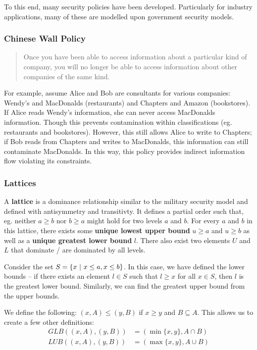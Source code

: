\documentclass[12pt]{article}
\begin{document}
To this end, many security policies have been developed. Particularly for industry applications, many of these are modelled upon government security models.

\subsubsection{Chinese Wall Policy}
\begin{quote}
Once you have been able to access information about a particular kind of company, you will no longer be able to access information about other companies of the same kind.
\end{quote}

For example, assume Alice and Bob are consultants for various companies: Wendy's and MacDonalds (restaurants) and Chapters and Amazon (bookstores). If Alice reads Wendy's information, she can never access MacDonalds information. Though this prevents contamination within classifications (eg. restaurants and bookstores). However, this still allows Alice to write to Chapters; if Bob reads from Chapters and writes to MacDonalds, this information can still contaminate MacDonalds. In this way, this policy provides indirect information flow violating its constraints.

\subsubsection{Lattices}
A {\bf lattice} is a dominance relationship similar to the military security model and defined with antisymmetry and transitivty. It defines a partial order such that, eg. neither $a \geq b$ nor $b \geq a$ might hold for two levels $a$ and $b$. For every $a$ and $b$ in this lattice, there exists some {\bf unique lowest upper bound} $u \geq a$ and $u \geq b$ as well as a {\bf unique greatest lower bound} $l$. There also exist two elements $U$ and $L$ that dominate / are dominated by all levels.

Consider the set $S = \{ x \ |\  x \leq a, x \leq b \}$. In this case, we have defined the lower bounds -- if there exists an element $l \in S$ such that $l \geq x$ for all $x \in S$, then $l$ is the greatest lower bound. Similarly, we can find the greatest upper bound from the upper bounds.

We define the following: $(x, A) \leq (y, B)$ if $x \geq y$ and $B \subseteq A$. This allows us to create a few other definitions:
\begin{align*}
GLB((x, A), (y, B)) &= (\min\{x,y\}, A \cap B) \\
LUB((x, A), (y, B)) &= (\max\{x,y\}, A \cup B)
\end{align*}
\end{document}
